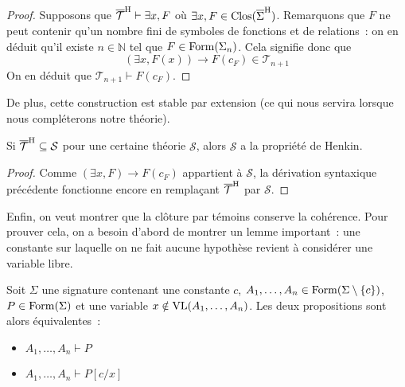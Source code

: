 \begin{proof}
  Supposons que $\overline{\mathcal T}^{\mathrm H}\vdash\exists x,F$ où
  $\exists x, F\in\operatorname{Clos}(\overline{\Sigma}^{\mathrm H})$. Remarquons que $F$ ne peut contenir
  qu'un nombre fini de symboles de fonctions et de relations~: on en déduit
  qu'il existe $n\in \mathbb N$ tel que $F\in\operatorname{Form}(\Sigma_n)$. Cela signifie
  donc que
  \[(\exists x,F(x))\to F(c_F) \in \mathcal T_{n+1}\]
  On en déduit que $\mathcal T_{n+1}\vdash F(c_F)$.
\end{proof}

De plus, cette construction est stable par extension (ce qui nous servira
lorsque nous compléterons notre théorie).

\begin{property}\label{prop.henkin.ext}
  Si $\overline{\mathcal T}^{\mathrm H}\subseteq \mathcal S$ pour une certaine théorie
  $\mathcal S$, alors $\mathcal S$ a la propriété de Henkin.
\end{property}

\begin{proof}
  Comme $(\exists x,F)\to F(c_F)$ appartient à $\mathcal S$, la dérivation
  syntaxique précédente fonctionne encore en remplaçant $\overline{\mathcal T}^{\mathrm H}$
  par $\mathcal S$.
\end{proof}

Enfin, on veut montrer que la clôture par témoins conserve la cohérence. Pour
prouver cela, on a besoin d'abord de montrer un lemme important~: une constante
sur laquelle on ne fait aucune hypothèse revient à considérer une variable
libre.

\begin{lemma}\label{lem.var.const}
  Soit $\Sigma$ une signature contenant une constante $c$,
  $A_1,\ldots,A_n\in\operatorname{Form}(\Sigma\setminus\{c\})$, $P\in\operatorname{Form}(\Sigma)$ et
  une variable $x\notin \operatorname{VL}(A_1,\ldots,A_n)$.
  Les deux propositions sont alors équivalentes~:
  \begin{itemize}
  \item $A_1,\ldots,A_n\vdash P$
  \item $A_1,\ldots,A_n\vdash P[c/x]$
  \end{itemize}
\end{lemma}

